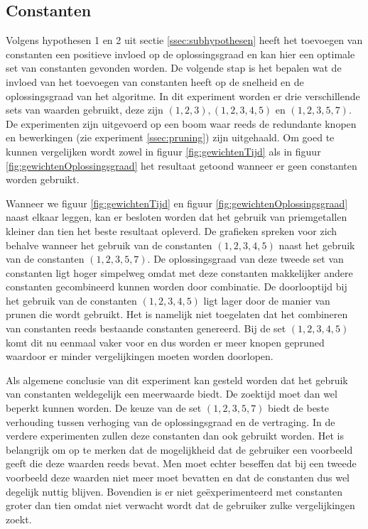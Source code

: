 \documentclass[Main.tex]{subfiles}
\begin{document}
\subsection{Constanten}
Volgens hypothesen 1 en 2 uit sectie \ref{ssec:subhypothesen} heeft het toevoegen van constanten een positieve invloed op de oplossingsgraad en kan hier een optimale set van constanten gevonden worden.
De volgende stap is het bepalen wat de invloed van het toevoegen van constanten heeft op de snelheid en de oplossingsgraad van het algoritme. In dit experiment worden er drie verschillende sets van waarden gebruikt, deze zijn $(1,2,3), (1,2,3,4,5)$ en $(1,2,3,5,7)$. 
De experimenten zijn uitgevoerd op een boom waar reeds de redundante knopen en bewerkingen (zie experiment \ref{ssec:pruning}) zijn uitgehaald. Om goed te kunnen vergelijken wordt zowel in figuur \ref{fig:gewichtenTijd} als in figuur \ref{fig:gewichtenOplossingsgraad} het resultaat getoond wanneer er geen constanten worden gebruikt. 
\par Wanneer we figuur \ref{fig:gewichtenTijd} en figuur \ref{fig:gewichtenOplossingsgraad} naast elkaar leggen, kan er besloten worden dat het gebruik van priemgetallen kleiner dan tien het beste resultaat opleverd. De grafieken spreken voor zich behalve wanneer het gebruik van de constanten $(1, 2, 3, 4, 5)$  naast het gebruik van de constanten $(1, 2, 3, 5, 7)$. De oplossingsgraad van deze tweede set van constanten ligt hoger simpelweg omdat met deze constanten makkelijker andere constanten gecombineerd kunnen worden door combinatie. De doorlooptijd bij het gebruik van de constanten $(1, 2, 3, 4, 5)$ ligt lager door de manier van prunen die wordt gebruikt. Het is namelijk niet toegelaten dat het combineren van constanten reeds bestaande constanten genereerd. Bij de set $(1, 2, 3, 4, 5)$ komt dit nu eenmaal vaker voor en dus worden er meer knopen gepruned waardoor er minder vergelijkingen moeten worden doorlopen.\par
Als algemene conclusie van dit experiment kan gesteld worden dat het gebruik van constanten weldegelijk een meerwaarde biedt. De zoektijd moet dan wel beperkt kunnen worden. De keuze van de set $(1, 2, 3, 5, 7)$ biedt de beste verhouding tussen verhoging van de oplossingsgraad en de vertraging. In de verdere experimenten zullen deze constanten dan ook gebruikt worden. Het is belangrijk om op te merken dat de mogelijkheid dat de gebruiker een voorbeeld geeft die deze waarden reeds bevat. Men moet echter beseffen dat bij een tweede voorbeeld deze waarden niet meer moet bevatten en dat de constanten dus wel degelijk nuttig blijven. Bovendien is er niet ge\"experimenteerd met constanten groter dan tien omdat niet verwacht wordt dat de gebruiker zulke vergelijkingen zoekt.
\end{document}
